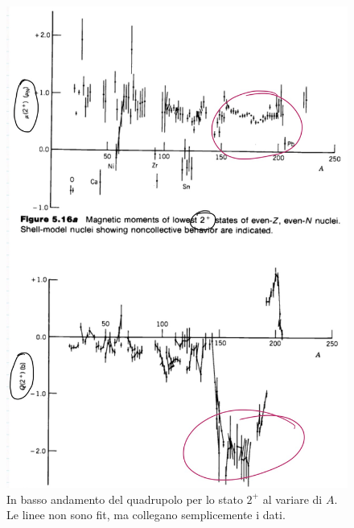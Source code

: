 \begin{figure}[h]
    \centering
    \includegraphics[scale=0.25]{Immagini/150200_2.png}
    \caption{In basso andamento del quadrupolo per lo stato $2^+$ al variare di $A$. Le linee non sono fit, ma collegano semplicemente i dati.}
    \label{graf2+1}
\end{figure}

